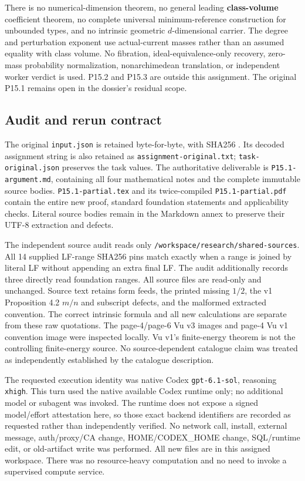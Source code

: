 \documentclass[
  11pt,
]{article}
\begin{document}
There is no numerical-dimension theorem, no general leading
\textbf{class-volume} coefficient theorem, no complete universal
minimum-reference construction for unbounded types, and no intrinsic
geometric \(d\)-dimensional carrier. The degree and perturbation
exponent use actual-current masses rather than an assumed equality with
class volume. No fibration, ideal-equivalence-only recovery, zero-mass
probability normalization, nonarchimedean translation, or independent
worker verdict is used. P15.2 and P15.3 are outside this assignment. The
original P15.1 remains open in the dossier's residual scope.

\subsection{Audit and rerun contract}\label{audit-and-rerun-contract}

The original \texttt{input.json} is retained byte-for-byte, with SHA256
.
Its decoded assignment string is also retained as
\texttt{assignment-original.txt}; \texttt{task-original.json} preserves
the task values. The authoritative deliverable is
\texttt{P15.1-argument.md}, containing all four mathematical notes and
the complete immutable source bodies. \texttt{P15.1-partial.tex} and its
twice-compiled \texttt{P15.1-partial.pdf} contain the entire new proof,
standard foundation statements and applicability checks. Literal source
bodies remain in the Markdown annex to preserve their UTF-8 extraction
and defects.

The independent source audit reads only
\texttt{/workspace/research/shared-sources}. All 14 supplied LF-range
SHA256 pins match exactly when a range is joined by literal LF without
appending an extra final LF. The audit additionally records three
directly read foundation ranges. All source files are read-only and
unchanged. Source text retains form feeds, the printed missing \(1/2\),
the v1 Proposition 4.2 \(m/n\) and subscript defects, and the malformed
extracted convention. The correct intrinsic formula and all new
calculations are separate from these raw quotations. The page-4/page-6
Vu v3 images and page-4 Vu v1 convention image were inspected locally.
Vu v1's finite-energy theorem is not the controlling finite-energy
source. No source-dependent catalogue claim was treated as independently
established by the catalogue description.

The requested execution identity was native Codex \texttt{gpt-6.1-sol},
reasoning \texttt{xhigh}. This turn used the native available Codex
runtime only; no additional model or subagent was invoked. The runtime
does not expose a signed model/effort attestation here, so those exact
backend identifiers are recorded as requested rather than independently
verified. No network call, install, external message, auth/proxy/CA
change, HOME/CODEX\_HOME change, SQL/runtime edit, or old-artifact write
was performed. All new files are in this assigned workspace. There was
no resource-heavy computation and no need to invoke a supervised compute
service.
\end{document}
